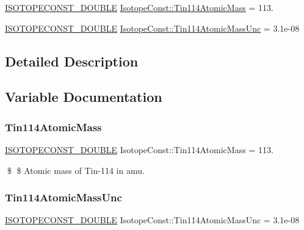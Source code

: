 \begin{DoxyCompactItemize}
\item 
\mbox{\hyperlink{group___isotope_const-_macros_ga8f45a7272ce02c0b4c65c44636ed719a}{I\+S\+O\+T\+O\+P\+E\+C\+O\+N\+S\+T\+\_\+\+D\+O\+U\+B\+LE}} \mbox{\hyperlink{group___isotope_const-_tin-_sn114_gaa6de526d4932aec6f80168fef58f1b2e}{Isotope\+Const\+::\+Tin114\+Atomic\+Mass}} = 113.
\item 
\mbox{\hyperlink{group___isotope_const-_macros_ga8f45a7272ce02c0b4c65c44636ed719a}{I\+S\+O\+T\+O\+P\+E\+C\+O\+N\+S\+T\+\_\+\+D\+O\+U\+B\+LE}} \mbox{\hyperlink{group___isotope_const-_tin-_sn114_ga52638bb59e9a987dc89ebe73b52764c8}{Isotope\+Const\+::\+Tin114\+Atomic\+Mass\+Unc}} = 3.\+1e-\/08
\end{DoxyCompactItemize}


\subsection{Detailed Description}


\subsection{Variable Documentation}
\mbox{\label{group___isotope_const-_tin-_sn114_gaa6de526d4932aec6f80168fef58f1b2e}} 
\subsubsection{\texorpdfstring{Tin114\+Atomic\+Mass}{Tin114AtomicMass}}
{\footnotesize\ttfamily \mbox{\hyperlink{group___isotope_const-_macros_ga8f45a7272ce02c0b4c65c44636ed719a}{I\+S\+O\+T\+O\+P\+E\+C\+O\+N\+S\+T\+\_\+\+D\+O\+U\+B\+LE}} Isotope\+Const\+::\+Tin114\+Atomic\+Mass = 113.}

\$ \$ Atomic mass of Tin-\/114 in amu. \mbox{\label{group___isotope_const-_tin-_sn114_ga52638bb59e9a987dc89ebe73b52764c8}} 
\subsubsection{\texorpdfstring{Tin114\+Atomic\+Mass\+Unc}{Tin114AtomicMassUnc}}
{\footnotesize\ttfamily \mbox{\hyperlink{group___isotope_const-_macros_ga8f45a7272ce02c0b4c65c44636ed719a}{I\+S\+O\+T\+O\+P\+E\+C\+O\+N\+S\+T\+\_\+\+D\+O\+U\+B\+LE}} Isotope\+Const\+::\+Tin114\+Atomic\+Mass\+Unc = 3.\+1e-\/08}

